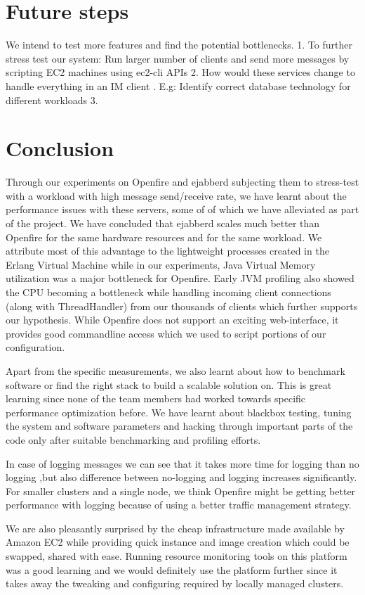 \documentclass[a4paper, twocolumn]{article}
\begin{document}
\section{Future steps}
We intend to test more features and find the potential bottlenecks. 
1. To further stress test our system: Run larger number of clients and send more messages by scripting EC2 machines using ec2-cli APIs
2. How would these services change to handle everything in an IM client . E.g: Identify correct database technology for different workloads 
3. 

\section{Conclusion}
Through our experiments on Openfire and ejabberd subjecting them to stress-test with a workload with high message send/receive rate, we have learnt about the performance issues with these servers, some of of which we have alleviated as part of the project. We have concluded that ejabberd scales much better than Openfire for the same hardware resources and for the same workload. We attribute most of this advantage to the lightweight processes created in the Erlang Virtual Machine while in our experiments, Java Virtual Memory utilization was a major bottleneck for Openfire. Early JVM profiling also showed the CPU becoming a bottleneck while handling incoming client connections (along with ThreadHandler) from our thousands of clients which further supports our hypothesis. While Openfire does not support an exciting web-interface, it provides good commandline access which we used to script portions of our configuration. 

Apart from the specific measurements, we also learnt about how to benchmark software or find the right stack to build a scalable solution on. This is great learning since none of the team members had worked towards specific performance optimization before. We have learnt about blackbox testing, tuning the system and software parameters and hacking through important parts of the code only after suitable benchmarking and profiling efforts. 

In case of logging messages we can see that it takes more time for logging than no logging ,but also difference between no-logging and logging increases significantly. For smaller clusters and a single node, we think Openfire might be getting better performance with logging because of using a better traffic management strategy.

We are also pleasantly surprised by the cheap infrastructure made available by Amazon EC2 while providing quick instance and image creation which could be swapped, shared with ease. Running resource monitoring tools on this platform was a good learning and we would definitely use the platform further since it takes away the tweaking and configuring required by locally managed clusters. 
\end{document}
